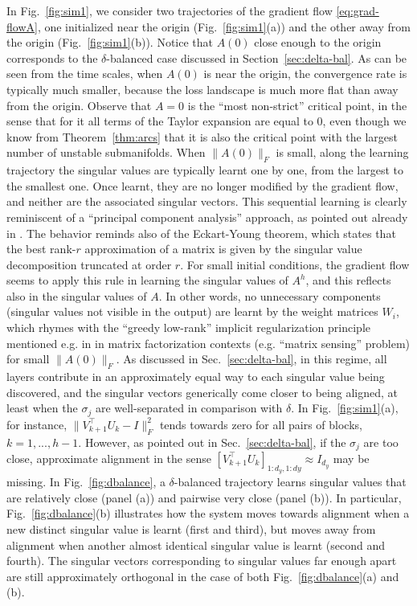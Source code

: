 \documentclass{article}
\newcommand{\1}{\mathds{1}}
\begin{document}
In Fig.~\ref{fig:sim1}, we consider two trajectories of the gradient flow \eqref{eq:grad-flowA}, one initialized near the origin (Fig.~\ref{fig:sim1}(a)) and the other away from the origin (Fig.~\ref{fig:sim1}(b)). Notice that $A(0)$ close enough to the origin corresponds to the $ \delta$-balanced case discussed in Section~\ref{sec:delta-bal}.
As can be seen from the time scales, when $A(0)$ is near the origin, the convergence rate is typically much smaller, because the loss landscape is much more flat than away from the origin. 
Observe that $A=0$ is the ``most non-strict'' critical point, in the sense that for it all terms of the Taylor expansion are equal to 0, even though we know from Theorem~\ref{thm:arcs} that it is also the critical point with the largest number of unstable submanifolds. 
When $ \| A(0) \|_F $ is small, along the learning trajectory the singular values are typically learnt one by one, from the largest to the smallest one. Once learnt, they are no longer modified by the gradient flow, and neither are the associated singular vectors. This sequential learning is clearly reminiscent of a ``principal component analysis'' approach, as pointed out already in \cite{baldi1989neural}.
The behavior reminds also of the Eckart-Young theorem, which states that the best rank-$r $ approximation of a matrix is given by the singular value decomposition truncated at order $ r $. For small initial conditions, the gradient flow seems to apply this rule in learning the singular values of $A^h$, and this reflects also in the singular values of $A$. In other words, no unnecessary components (singular values not visible in the output) are learnt by the weight matrices $W_i$, which rhymes with the ``greedy low-rank'' implicit regularization principle mentioned e.g. in \cite{arora2019implicit,cohen2024lecture,li2020towards} in matrix factorization contexts (e.g. ``matrix sensing'' problem) for small $ \|A(0)\|_F $. 
As discussed in Sec.~\ref{sec:delta-bal}, in this regime, all layers contribute in an approximately equal way to each singular value being discovered, and the singular vectors generically come closer to being aligned, at least when the $ \sigma_j $ are well-separated in comparison with $ \delta$. In Fig.~\ref{fig:sim1}(a), for instance, $ \| V_{k+1}^{ \top} U_{k} - I \|_F^2 $ tends towards zero for all pairs of blocks, $k=1,...,h-1$. 
However, as pointed out in Sec.~\ref{sec:delta-bal}, if the $ \sigma_j $ are too close, approximate alignment in the sense $ [V_{k+1}^\top U_k]_{1:d_y,1:dy} \approx I_{d_y} $ may be missing. In Fig.~\ref{fig:dbalance}, a $ \delta $-balanced trajectory learns singular values that are relatively close (panel (a)) and pairwise very close (panel (b)). In particular, Fig.~\ref{fig:dbalance}(b) illustrates how the system moves towards alignment when a new distinct singular value is learnt (first and third), but moves away from alignment when another almost identical singular value is learnt (second and fourth). The singular vectors corresponding to singular values far enough apart are still approximately orthogonal in the case of both Fig.~\ref{fig:dbalance}(a) and (b).
\end{document}
